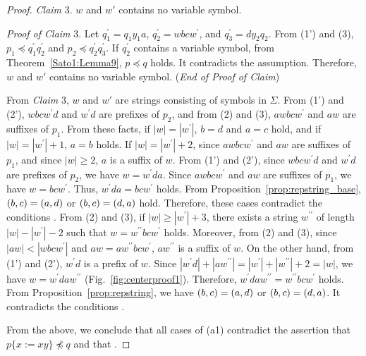 \begin{proof}
  \smallskip

  \noindent
  \textit{Claim} 3. $w$ and $w'$ contains no variable symbol.

  \smallskip
  \noindent
  \textit{Proof of Claim} 3.
  Let $q_{1}^{\prime} = q_{1}y_{1}a$, $q_{2}^{\prime} = wbcw^{\prime}$, and $q_{3}^{\prime} = dy_{2}q_{2}$. From (1') and (3), $p_{1} \preceq q^{\prime}_{1}q^{\prime}_{2}$ and $p_{2} \preceq q^{\prime}_{2}q^{\prime}_{3}$. If $q_{2}^{\prime}$ contains a variable symbol, from Theorem~\ref{Sato1:Lemma9}, $p \preceq q$ holds. It contradicts the assumption. Therefore, $w$ and $w'$ contains no variable symbol. (\textit{End of Proof of Claim})

  \smallskip

  From \textit{Claim} 3, $w$ and $w'$ are strings consisting of symbols in $\Sigma$. From (1') and (2'), $wbcw^{\prime}d$ and $w^{\prime}d$ are prefixes of $p_{2}$, and from (2) and (3), $awbcw^{\prime}$ and $aw$ are suffixes of $p_{1}$.
  From these facts, if $|w|=|w^{\prime}|$, $b = d$ and $a = c$ hold, and if $|w|=|w^{\prime}|+1$, $a = b$ holds.
  If $|w| = |w^{\prime}|+2$, since $awbcw^{\prime}$ and $aw$ are suffixes of $p_{1}$, and since $|w|\geq 2$, $a$ is a suffix of $w$.
  From (1') and (2'), since $wbcw^{\prime}d$ and $w^{\prime}d$ are prefixes of $p_{2}$, we have $w=w^{\prime}da$.
  Since $awbcw^{\prime}$ and $aw$ are suffixes of $p_{1}$, we have $w=bcw^{\prime}$.
  Thus, $w^{\prime}da = bcw^{\prime}$ holds.
  From Proposition~\ref{prop:repstring_base}, $(b,c) = (a,d)$ or $(b,c) = (d,a)$ hold.
  Therefore, these cases contradict the conditions \TheConditionA.
  From (2) and (3), if $|w| \ge |w^{\prime}|+3$, there exists a string $w^{\prime\prime}$ of length $|w|-|w^{\prime}|-2$ such that $w=w^{\prime\prime}bcw^{\prime}$ holds.
  Moreover, from (2) and (3), since $|aw| < |wbcw^{\prime}|$ and $aw = aw^{\prime\prime}bcw^{\prime}$, $aw^{\prime\prime}$ is a suffix of $w$.
  On the other hand, from (1') and (2'), $w^{\prime}d$ is a prefix of $w$.
  Since $|w^{\prime}d| + |aw^{\prime\prime}| = |w^{\prime}| + |w^{\prime\prime}| + 2 = |w|$, we have $w=w^{\prime}daw^{\prime\prime}$ (Fig.~\ref{fig:centerproof1}). Therefore, $w^{\prime}daw^{\prime\prime} = w^{\prime\prime}bcw^{\prime}$ holds.
  From Proposition~\ref{prop:repstring}, we have $(b,c) = (a,d)$ or $(b,c) = (d,a)$.
  It contradicts the conditions \TheConditionA.

  From the above, we conclude that all cases of (a1) contradict the assertion that $p\{x := xy\} \not\preceq q$ and that \TheConditionA.
  

\end{proof}
